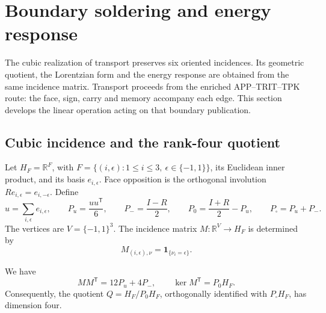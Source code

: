 
\section{Boundary soldering and energy response}
\label{vii:vii:sec:pantalla-respuesta}

The cubic realization of transport preserves six oriented incidences.
Its geometric quotient, the Lorentzian form and the energy response
are obtained from the same incidence matrix. Transport proceeds from
the enriched APP--TRIT--TPK route: the face, sign, carry and
memory accompany each edge. This section develops the
linear operation acting on that boundary publication.

\subsection{Cubic incidence and the rank-four quotient}
\label{vii:vii:sec:cociente-pantalla}

Let \(H_F=\mathbb R^F\), with
\(F=\{(i,\epsilon):1\leq i\leq3,\ \epsilon\in\{-1,1\}\}\),
its Euclidean inner product, and its basis \(e_{i,\epsilon}\).
Face opposition is the orthogonal involution
\(Re_{i,\epsilon}=e_{i,-\epsilon}\). Define
\[
 u=\sum_{i,\epsilon}e_{i,\epsilon},\qquad
 P_u=\frac{uu^{\mathsf T}}6,\qquad P_-=\frac{I-R}{2},\qquad
 P_0=\frac{I+R}{2}-P_u,\qquad P_\square=P_u+P_-.
\]
The vertices are \(V=\{-1,1\}^3\). The incidence matrix
\(M:\mathbb R^V\longrightarrow H_F\) is determined by
\[
 M_{(i,\epsilon),\nu}=\mathbf1_{\{\nu_i=\epsilon\}}.
\]

\begin{proposition}
\label{vii:vii:prop:incidencia}
We have
\[
 MM^{\mathsf T}=12P_u+4P_-,
 \qquad
 \ker M^{\mathsf T}=P_0H_F.
\]
Consequently, the quotient
\(Q=H_F/P_0H_F\), orthogonally identified with
\(P_\square H_F\), has dimension four.
\end{proposition}

